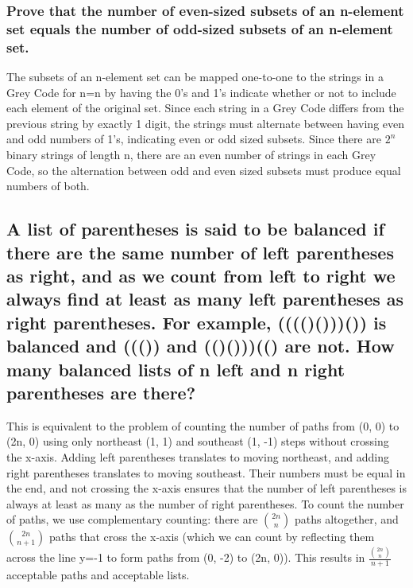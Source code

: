 \documentclass[11pt,twosided]{article}
\begin{document}

\subsubsection{Prove that the number of even-sized subsets of an n-element set equals the number of odd-sized subsets of an n-element set.}
The subsets of an n-element set can be mapped one-to-one to the strings in a Grey Code for n=n by having the 0's and 1's indicate whether or not to include each element of the original set. Since each string in a Grey Code differs from the previous string by exactly 1 digit, the strings must alternate between having even and odd numbers of 1's, indicating even or odd sized subsets. Since there are $2^n$ binary strings of length n, there are an even number of strings in each Grey Code, so the alternation between odd and even sized subsets must produce equal numbers of both. 


\subsection{A list of parentheses is said to be balanced if there are the same number of left parentheses as right, and as we count from left to right we always find at least as many left parentheses as right parentheses. For example, (((()()))()) is balanced and ((()) and (()()))(() are not. How many balanced lists of n left and n right parentheses are there?}
This is equivalent to the problem of counting the number of paths from (0, 0) to (2n, 0) using only northeast (1, 1) and southeast (1, -1) steps without crossing the x-axis. Adding left parentheses translates to moving northeast, and adding right parentheses translates to moving southeast. Their numbers must be equal in the end, and not crossing the x-axis ensures that the number of left parentheses is always at least as many as the number of right parentheses. To count the number of paths, we use complementary counting: there are ${2n \choose n}$ paths altogether, and ${2n \choose n+1}$ paths that cross the x-axis (which we can count by reflecting them across the line y=-1 to form paths from (0, -2) to (2n, 0)). This results in \(\frac{\binom{2n}{n}}{n+1}\) acceptable paths and acceptable lists. 

\end{document}
